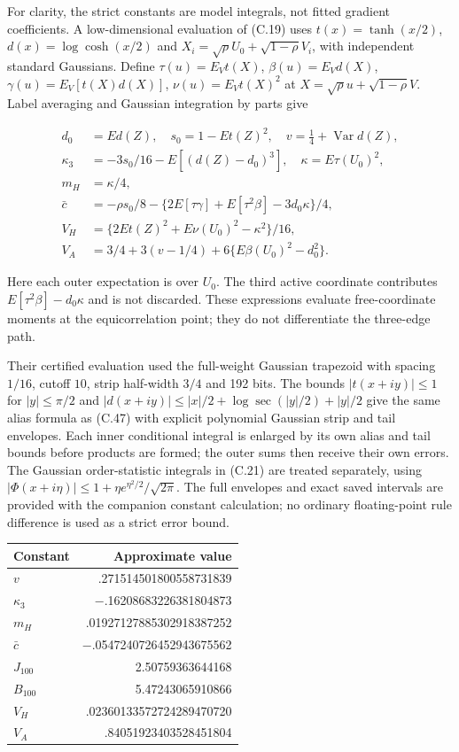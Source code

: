 \documentclass{article}
\begin{document}
For clarity, the strict constants are model integrals, not fitted
gradient coefficients. A low-dimensional evaluation of (C.19) uses
\(t(x)=\tanh(x/2)\), \(d(x)=\log\cosh(x/2)\) and
\(X_i=\sqrt\rho U_0+\sqrt{1-\rho}V_i\), with independent standard
Gaussians. Define \(\tau(u)=E_Vt(X)\), \(\beta(u)=E_Vd(X)\),
\(\gamma(u)=E_V[t(X)d(X)]\), \(\nu(u)=E_Vt(X)^2\) at
\(X=\sqrt\rho u+\sqrt{1-\rho}V\). Label averaging and Gaussian
integration by parts give

\[
\begin{aligned}
d_0&=Ed(Z),\quad s_0=1-Et(Z)^2,\quad v=\tfrac14+\operatorname{Var}d(Z),\\
\kappa_3&=-3s_0/16-E[(d(Z)-d_0)^3],\quad \kappa=E\tau(U_0)^2,\\
m_H&=\kappa/4,\\
\bar c&=-\rho s_0/8-\{2E[\tau\gamma]+E[\tau^2\beta]-3d_0\kappa\}/4,\\
V_H&=\{2Et(Z)^2+E\nu(U_0)^2-\kappa^2\}/16,\\
V_A&=3/4+3(v-1/4)+6\{E\beta(U_0)^2-d_0^2\}.
\end{aligned}
\tag{C.56}
\]

Here each outer expectation is over \(U_0\). The third active coordinate
contributes \(E[\tau^2\beta]-d_0\kappa\) and is not discarded. These
expressions evaluate free-coordinate moments at the equicorrelation
point; they do not differentiate the three-edge path.

Their certified evaluation used the full-weight Gaussian trapezoid with
spacing \(1/16\), cutoff \(10\), strip half-width \(3/4\) and 192 bits.
The bounds \(|t(x+iy)|\le1\) for \(|y|\le\pi/2\) and
\(|d(x+iy)|\le|x|/2+\log\sec(|y|/2)+|y|/2\) give the same alias formula
as (C.47) with explicit polynomial Gaussian strip and tail envelopes.
Each inner conditional integral is enlarged by its own alias and tail
bounds before products are formed; the outer sums then receive their own
errors. The Gaussian order-statistic integrals in (C.21) are treated
separately, using \(|\Phi(x+i\eta)|\le1+\eta e^{\eta^2/2}/\sqrt{2\pi}\).
The full envelopes and exact saved intervals are provided with the
companion constant calculation; no ordinary floating-point rule
difference is used as a strict error bound.


\begin{longtable}[]{@{}lr@{}}
\toprule\noalign{}
Constant & Approximate value \\
\midrule\noalign{}
\endhead
\bottomrule\noalign{}
\endlastfoot
\(v\) & .271514501800558731839 \\
\(\kappa_3\) & −.16208683226381804873 \\
\(m_H\) & .01927127885302918387252 \\
\(\bar c\) & −.0547240726452943675562 \\
\(J_{100}\) & 2.50759363644168 \\
\(B_{100}\) & 5.47243065910866 \\
\(V_H\) & .02360133572724289470720 \\
\(V_A\) & .84051923403528451804 \\
\end{longtable}
\end{document}
